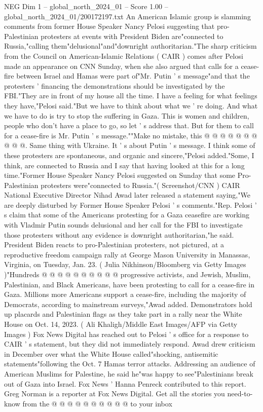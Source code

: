 \begin{textsample}{NEG Dim 1 – global\_north\_2024\_01 – Score 1.00 – global\_north\_2024\_01/200172197.txt}  \label{ex:f1_neg_292}
An American Islamic group is slamming comments from former House Speaker Nancy Pelosi suggesting that pro-Palestinian protesters at events with President Biden are"connected to Russia,"calling them"delusional"and"downright authoritarian."The sharp criticism from the Council on American-Islamic Relations ( CAIR ) comes after Pelosi made an appearance on CNN Sunday, when she also argued that calls for a cease-fire between Israel and Hamas were part of"Mr.
Putin ' s message"and that the protesters ' financing the demonstrations should be investigated by the FBI."They are in front of my house all the time.
I have a feeling for what feelings they have,"Pelosi said."But we have to think about what we ' re doing.
And what we have to do is try to stop the suffering in Gaza.
This is women and children, people who don't have a place to go, so let ' s address that.
But for them to call for a cease-fire is Mr.
Putin ' s message.""Make no mistake, this @ @ @ @ @ @ @ @ @ @.
Same thing with Ukraine.
It ' s about Putin ' s message.
I think some of these protesters are spontaneous, and organic and sincere,"Pelosi added."Some, I think, are connected to Russia and I say that having looked at this for a long time."Former House Speaker Nancy Pelosi suggested on Sunday that some Pro-Palestinian protesters were"connected to Russia."( Screenshot/CNN ) CAIR National Executive Director Nihad Awad later released a statement saying,"We are deeply disturbed by Former House Speaker Pelosi ' s comments."Rep.
Pelosi ' s claim that some of the Americans protesting for a Gaza ceasefire are working with Vladmir Putin sounds delusional and her call for the FBI to investigate those protesters without any evidence is downright authoritarian,"he said.
President Biden reacts to pro-Palestinian protesters, not pictured, at a reproductive freedom campaign rally at George Mason University in Manassas, Virginia, on Tuesday, Jan. 23. ( Julia Nikhinson/Bloomberg via Getty Images )"Hundreds @ @ @ @ @ @ @ @ @ @ progressive activists, and Jewish, Muslim, Palestinian, and Black Americans, have been protesting to call for a cease-fire in Gaza.
Millions more Americans support a cease-fire, including the majority of Democrats, according to mainstream surveys,"Awad added.
Demonstrators hold up placards and Palestinian flags as they take part in a rally near the White House on Oct. 14, 2023. ( Ali Khaligh/Middle East Images/AFP via Getty Images ) Fox News Digital has reached out to Pelosi ' s office for a response to CAIR ' s statement, but they did not immediately respond.
Awad drew criticism in December over what the White House called"shocking, antisemitic statements"following the Oct. 7 Hamas terror attacks.
Addressing an audience of American Muslims for Palestine, he said he"was happy to see"Palestinians break out of Gaza into Israel.
Fox News ' Hanna Penreck contributed to this report.
Greg Norman is a reporter at Fox News Digital.
Get all the stories you need-to-know from the @ @ @ @ @ @ @ @ @ @ to your inbox

\end{textsample}
